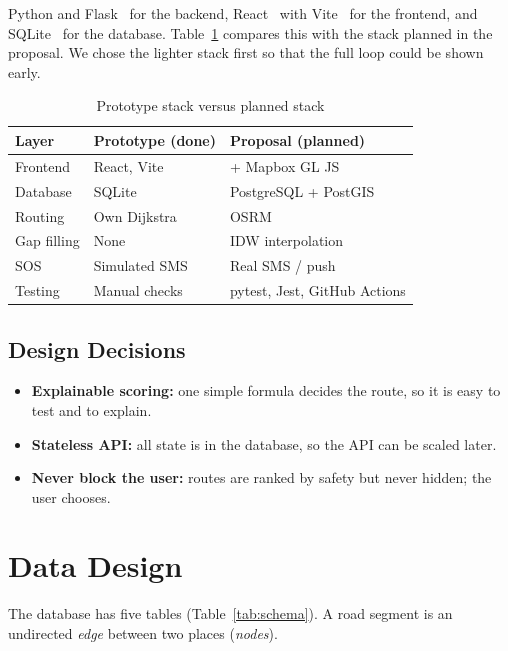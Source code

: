 \documentclass{tietreport}
\begin{document}
Python and Flask~\cite{flask} for the backend, React~\cite{react} with
Vite~\cite{vite} for the frontend, and SQLite~\cite{sqlite} for the
database. Table~\ref{tab:stack} compares this with the stack planned in
the proposal. We chose the lighter stack first so that the full loop
could be shown early.

\begin{table}[h]
\centering
\small
\begin{tabular}{|l|l|l|}
  \hline
  \textbf{Layer} & \textbf{Prototype (done)} & \textbf{Proposal (planned)} \\ \hline
  Frontend  & React, Vite & + Mapbox GL JS \\ \hline
  Database  & SQLite & PostgreSQL + PostGIS \\ \hline
  Routing   & Own Dijkstra & OSRM~\cite{luxen2011} \\ \hline
  Gap filling & None & IDW interpolation~\cite{shepard1968} \\ \hline
  SOS       & Simulated SMS & Real SMS / push \\ \hline
  Testing   & Manual checks & pytest, Jest, GitHub Actions \\ \hline
\end{tabular}
\caption{Prototype stack versus planned stack}
\label{tab:stack}
\end{table}

\subsection{Design Decisions}

\begin{itemize}
  \item \textbf{Explainable scoring:} one simple formula decides the
    route, so it is easy to test and to explain.
  \item \textbf{Stateless API:} all state is in the database, so the
    API can be scaled later.
  \item \textbf{Never block the user:} routes are ranked by safety but
    never hidden; the user chooses.
\end{itemize}

\section{Data Design}

The database has five tables (Table~\ref{tab:schema}). A road segment is
an undirected \emph{edge} between two places (\emph{nodes}).
\end{document}
